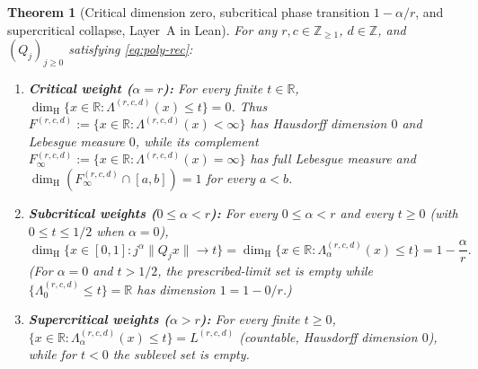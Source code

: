 \documentclass[11pt]{article}
\newtheorem{theorem}{Theorem}
\theoremstyle{definition}
\theoremstyle{remark}
\newcommand{\R}{\mathbb{R}}
\newcommand{\Z}{\mathbb{Z}}
\newcommand{\dimH}{\dim_{\mathrm{H}}}
\newcommand{\Lam}{\Lambda}
\begin{document}
\begin{theorem}[Critical dimension zero, subcritical phase transition $1-\alpha/r$,
and supercritical collapse, Layer~A in Lean]\label{thm:poly-phase-transition}
For any $r,c\in\Z_{\ge1}$, $d\in\Z$, and $(Q_j)_{j\ge0}$ satisfying \eqref{eq:poly-rec}:
\begin{enumerate}[label=(\roman*),leftmargin=2em]
\item \textbf{Critical weight ($\alpha=r$):} For every finite $t\in\R$,
$\dimH\{x\in\R:\Lam^{(r,c,d)}(x)\le t\}=0$. Thus
$F^{(r,c,d)}:=\{x\in\R:\Lam^{(r,c,d)}(x)<\infty\}$ has Hausdorff dimension $0$
and Lebesgue measure $0$, while its complement
$F_\infty^{(r,c,d)}:=\{x\in\R:\Lam^{(r,c,d)}(x)=\infty\}$ has full Lebesgue
measure and $\dimH(F_\infty^{(r,c,d)}\cap[a,b])=1$ for every $a<b$.
\item \textbf{Subcritical weights ($0\le\alpha<r$):} For every $0\le\alpha<r$ and
every $t\ge0$ (with $0\le t\le1/2$ when $\alpha=0$),
\[
\dimH\bigl\{x\in[0,1]:j^\alpha\|Q_jx\|\longrightarrow t\bigr\}
=\dimH\bigl\{x\in\R:\Lam_\alpha^{(r,c,d)}(x)\le t\bigr\}
=1-\frac{\alpha}{r}.
\]
(For $\alpha=0$ and $t>1/2$, the prescribed-limit set is empty while
$\{\Lam_0^{(r,c,d)}\le t\}=\R$ has dimension $1=1-0/r$.)
\item \textbf{Supercritical weights ($\alpha>r$):} For every finite $t\ge0$,
$\{x\in\R:\Lam_\alpha^{(r,c,d)}(x)\le t\}=L^{(r,c,d)}$ (countable, Hausdorff
dimension $0$), while for $t<0$ the sublevel set is empty.
\end{enumerate}
\end{theorem}
\end{document}
